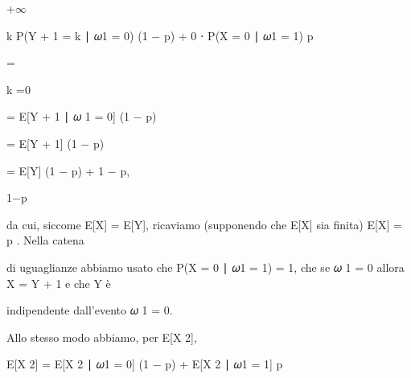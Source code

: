 \documentclass[a4paper,portrait,12pt]{article}
\begin{document}
+$\infty$





\begin{flushleft}
k P(Y + 1 = k ∣ 𝜔1 = 0) (1 $-$ p) + 0 ⋅ P(X = 0 ∣ 𝜔1 = 1) p
\end{flushleft}





=


\begin{flushleft}
k =0
\end{flushleft}





\begin{flushleft}
= E[Y + 1 ∣ 𝜔 1 = 0] (1 $-$ p)
\end{flushleft}


\begin{flushleft}
= E[Y + 1] (1 $-$ p)
\end{flushleft}


\begin{flushleft}
= E[Y] (1 $-$ p) + 1 $-$ p,
\end{flushleft}


\begin{flushleft}
1$-$p
\end{flushleft}





\begin{flushleft}
da cui, siccome E[X] = E[Y], ricaviamo (supponendo che E[X] sia finita) E[X] = p . Nella catena
\end{flushleft}


\begin{flushleft}
di uguaglianze abbiamo usato che P(X = 0 ∣ 𝜔1 = 1) = 1, che se 𝜔 1 = 0 allora X = Y + 1 e che Y \`{e}
\end{flushleft}


\begin{flushleft}
indipendente dall'evento 𝜔 1 = 0.
\end{flushleft}


\begin{flushleft}
Allo stesso modo abbiamo, per E[X 2],
\end{flushleft}


\begin{flushleft}
E[X 2] = E[X 2 ∣ 𝜔1 = 0] (1 $-$ p) + E[X 2 ∣ 𝜔1 = 1] p
\end{flushleft}
\end{document}
